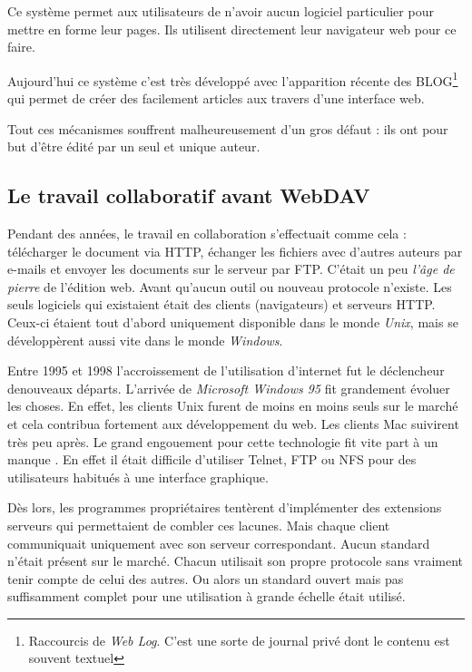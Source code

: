 \documentclass[a4paper, 11pt]{article}
\begin{document}
{		Ce système permet aux utilisateurs de n'avoir aucun logiciel particulier pour mettre en forme leur pages. Ils utilisent directement leur navigateur web pour ce faire. 
		
		Aujourd'hui ce système c'est très développé avec l'apparition récente des BLOG\footnote{Raccourcis de \emph{Web Log}. C'est une sorte de journal privé dont le contenu est souvent textuel} qui permet de créer des facilement articles aux travers d'une interface web.
		
		Tout ces mécanismes souffrent malheureusement d'un gros défaut : ils ont pour but d'être édité par un seul et unique auteur. 

	\subsection{Le travail collaboratif avant WebDAV}

		Pendant des années, le travail en collaboration s'effectuait comme cela : télécharger le document via HTTP, échanger les fichiers avec d'autres auteurs par e-mails et envoyer les documents sur le serveur par FTP. C'était un peu \emph{l'âge de pierre} de l'édition web. Avant qu'aucun outil ou nouveau protocole n'existe. Les seuls logiciels qui existaient était des clients (navigateurs) et serveurs HTTP. Ceux-ci étaient tout d'abord uniquement disponible dans le monde \emph{Unix}, mais se développèrent aussi vite dans le monde \emph{Windows}.
		
		Entre 1995 et 1998 l'accroissement de l'utilisation d'internet fut le déclencheur denouveaux départs. L'arrivée de \emph{Microsoft Windows 95} fit grandement évoluer les choses. En effet, les clients Unix furent de moins en moins seuls sur le marché et cela contribua fortement aux développement du web. Les clients Mac suivirent très peu après. Le grand engouement pour cette technologie fit vite part à un manque . En effet il était difficile d'utiliser Telnet, FTP ou NFS pour des utilisateurs habitués à une interface graphique. 
		
	Dès lors, les programmes propriétaires tentèrent d'implémenter des extensions serveurs qui permettaient de combler ces lacunes. Mais chaque client communiquait uniquement avec son serveur correspondant. Aucun standard n'était présent sur le marché. Chacun utilisait son propre protocole sans vraiment tenir compte de celui des autres. Ou alors un standard ouvert mais pas suffisamment complet pour une utilisation à grande échelle était utilisé.
		
}
\end{document}
